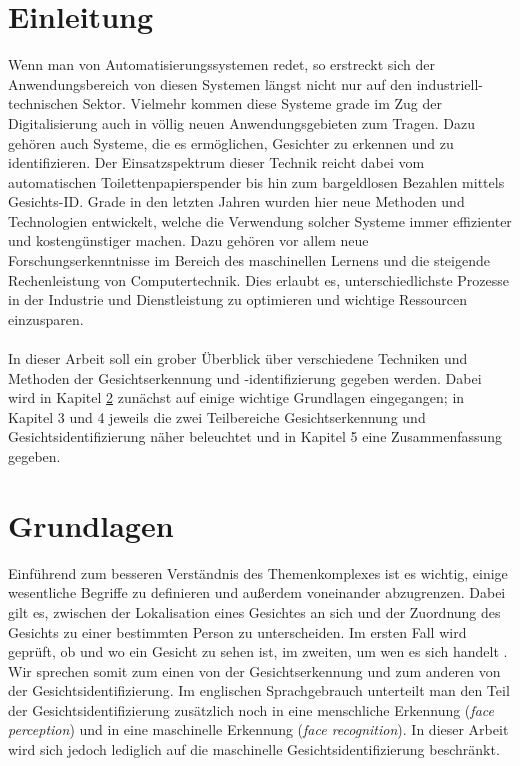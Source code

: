 \documentclass[doktyp=semarbeit, sprache=german]{TUBAFarbeiten}
\begin{document}
\maketitle
\tableofcontents
\newpage
\section{Einleitung}
Wenn man von Automatisierungssystemen redet, so erstreckt sich der Anwendungsbereich von diesen Systemen längst nicht nur auf den industriell-technischen Sektor. Vielmehr kommen diese Systeme grade im Zug der Digitalisierung auch in völlig neuen Anwendungsgebieten zum Tragen. Dazu gehören auch Systeme, die es ermöglichen, Gesichter zu erkennen und zu identifizieren.
Der Einsatzspektrum dieser Technik reicht dabei vom automatischen Toilettenpapierspender bis hin zum bargeldlosen Bezahlen mittels Gesichts-ID. Grade in den letzten Jahren wurden hier neue Methoden und Technologien entwickelt, welche die Verwendung solcher Systeme immer effizienter und kostengünstiger machen. Dazu gehören vor allem neue Forschungserkenntnisse im Bereich des maschinellen Lernens und die steigende Rechenleistung von Computertechnik. Dies erlaubt es, unterschiedlichste Prozesse in der Industrie und Dienstleistung zu optimieren und wichtige Ressourcen einzusparen.
\\\\In dieser Arbeit soll ein grober Überblick über verschiedene Techniken und Methoden der Gesichtserkennung und -identifizierung gegeben werden. Dabei wird in Kapitel \ref{sec:grundlagen} zunächst auf einige wichtige Grundlagen eingegangen; in Kapitel 3 und 4 jeweils die zwei Teilbereiche Gesichtserkennung und Gesichtsidentifizierung näher beleuchtet und in Kapitel 5 eine Zusammenfassung gegeben. 
\section{Grundlagen}
\label{sec:grundlagen}
Einführend zum besseren Verständnis des Themenkomplexes ist es wichtig, einige wesentliche Begriffe zu definieren und außerdem voneinander abzugrenzen. Dabei gilt es, zwischen der Lokalisation eines Gesichtes an sich und der Zuordnung des Gesichts zu einer bestimmten Person zu unterscheiden. Im ersten Fall wird geprüft, ob und wo ein Gesicht zu sehen ist, im zweiten, um wen es sich handelt \cite{FaceRecognitionWikipedia}. Wir sprechen somit zum einen von der Gesichtserkennung und zum anderen von der Gesichtsidentifizierung. Im englischen Sprachgebrauch unterteilt man den Teil der Gesichtsidentifizierung zusätzlich noch in eine menschliche Erkennung (\textit{face perception}) und in eine maschinelle Erkennung (\textit{face recognition}). In dieser Arbeit wird sich jedoch lediglich auf die maschinelle Gesichtsidentifizierung beschränkt.
\newpage
\end{document}
